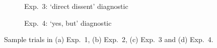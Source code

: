 \documentclass[12pt]{article}
\begin{document}
\begin{figure}[h!]
\begin{subfigure}{.49\textwidth}
\centering
{}
 \caption{Exp.~3: `direct dissent' diagnostic}
 \end{subfigure} 
 \begin{subfigure}{.49\textwidth}
\centering
{}
 \caption{Exp.~4: `yes, but' diagnostic}
 \end{subfigure}

\caption{Sample trials in (a) Exp.~1, (b) Exp.~2, (c) Exp.~3 and (d) Exp.~4.} \label{fig:trials}

\end{figure}
\end{document}
